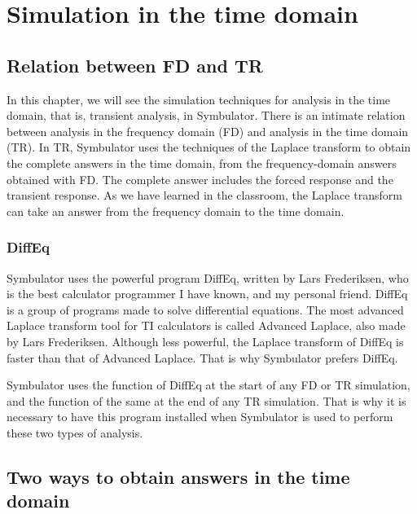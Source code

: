 
\chapter{Simulation in the time domain}

\section{Relation between FD and TR}

In this chapter, we will see the simulation techniques for analysis
in the time domain, that is, transient analysis, in Symbulator.
There is an intimate relation between analysis in the frequency
domain (FD) and analysis in the time domain (TR). In TR, Symbulator
uses the techniques of the Laplace transform to obtain the complete
answers in the time domain, from the frequency-domain answers
obtained with FD. The complete answer includes the forced response
and the transient response. As we have learned in the classroom, the
Laplace transform can take an answer from the frequency domain to
the time domain.

\subsection{DiffEq}

Symbulator uses the powerful program DiffEq, written by Lars
Frederiksen, who is the best calculator programmer I have known, and
my personal friend. DiffEq is a group of programs made to solve
differential equations. The most advanced Laplace transform tool for
TI calculators is called Advanced Laplace, also made by Lars
Frederiksen. Although less powerful, the Laplace transform of DiffEq
is faster than that of Advanced Laplace. That is why Symbulator
prefers DiffEq.

Symbulator uses the  function of DiffEq at the start
of any FD or TR simulation, and the  function of the
same at the end of any TR simulation. That is why it is necessary to
have this program installed when Symbulator is used to perform these
two types of analysis.

\section{Two ways to obtain answers in the time domain}

